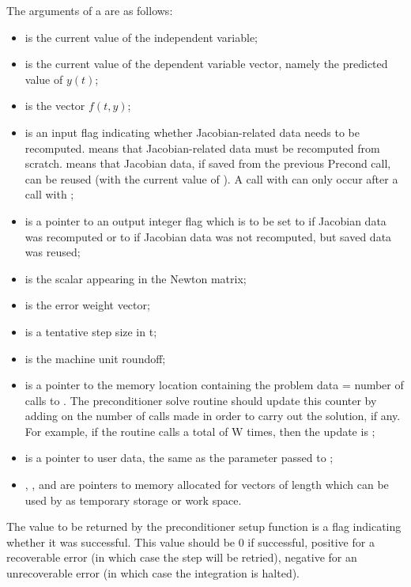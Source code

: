 \begin{itemize}
  The arguments of a  are as follows:
  \begin{itemize}
  \item 
     is the current value of the independent variable;
  \item 
     is the current value of the dependent variable vector, 
    namely the predicted value of $y(t)$;
  \item 
     is the vector $f(t,y)$;                                  
  \item 
     is an input flag indicating whether Jacobian-related   
    data needs to be recomputed.
     means that Jacobian-related data   
    must be recomputed from scratch.                                 
      means that Jacobian data, if saved from 
    the previous Precond call, can be reused      
    (with the current value of ).            
    A call with  can only occur after   
    a call with ;
  \item 
     is a pointer to an output integer flag which is        
    to be set to  if Jacobian data was recomputed or   
    to  if Jacobian data was not           
    recomputed, but saved data was reused;
  \item 
     is the scalar appearing in the Newton matrix;
  \item 
     is the error weight vector;                  
  \item 
     is a tentative step size in t;
  \item 
     is the machine unit roundoff;
  \item 
     is a pointer to the memory location containing the      
    {\cvodes} problem data  = number of calls to . 
    The preconditioner solve routine should update this counter by 
    adding on the number of  calls made in order to carry out     
    the solution, if any.  For example, if the routine      
    calls  a total of W times, then the update is          
    ;
  \item 
     is a pointer to user data, the same as the       
    parameter passed to ;
  \item 
    , , and  are pointers to memory allocated    
    for vectors of length  which can be used by           
     as temporary storage or work space.    
  \end{itemize}
  
  The value to be returned by the preconditioner setup function is a flag indicating 
  whether it was successful.  This value should be $0$ if successful, 
  positive for a recoverable error (in which case the step will be retried),     
  negative for an unrecoverable error (in which case the integration is halted). 
  
\end{itemize}

